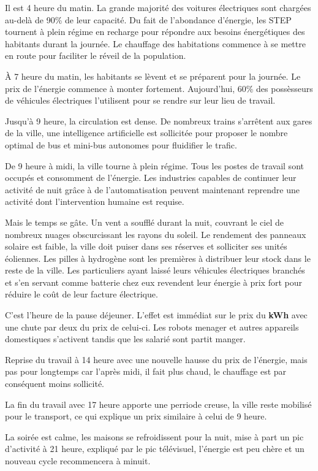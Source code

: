 Il est 4 heure du matin. La grande majorité des voitures électriques sont chargées au-delà de 90\% de leur capacité.
Du fait de l'abondance d'énergie, les STEP tournent à plein régime en recharge pour répondre aux besoins
énergétiques des habitants durant la journée.
Le chauffage des habitations commence à se mettre en route pour faciliter le réveil de la population.

À 7 heure du matin, les habitants se lèvent et se préparent pour la journée. Le prix de l'énergie commence à monter
fortement. Aujourd'hui, 60\% des possèsseurs de véhicules électriques l'utilisent pour se rendre sur leur lieu de travail.

Jusqu'à 9 heure, la circulation est dense. De nombreux trains s'arrêtent aux gares de la ville,
une intelligence artificielle est sollicitée pour proposer le nombre optimal
de bus et mini-bus autonomes pour fluidifier le trafic.

De 9 heure à midi, la ville tourne à plein régime. Tous les postes de travail sont occupés et consomment de l'énergie.
Les industries capables de continuer leur activité de nuit grâce à de l'automatisation peuvent maintenant
reprendre une activité dont l'intervention humaine est requise.

Mais le temps se gâte. Un vent a soufflé durant la nuit, couvrant le ciel de nombreux nuages obscurcissant
les rayons du soleil. Le rendement des panneaux solaire est faible, la ville doit puiser dans
ses réserves et solliciter ses unités éoliennes.
Les pilles à hydrogène sont les premières à distribuer leur stock dans le reste de la ville.
Les particuliers ayant laissé leurs véhicules électriques branchés et s'en servant comme batterie chez eux revendent 
leur énergie à prix fort pour réduire le coût de leur facture électrique.

C'est l'heure de la pause déjeuner. L'effet est immédiat sur le prix du \textbf{kWh} avec une chute par deux du prix
de celui-ci. Les robots menager et autres appareils domestiques s'activent tandis que les salarié sont partit manger.

Reprise du travail à 14 heure avec une nouvelle hausse du prix de l'énergie, mais pas pour longtemps car l'après midi,
il fait plus chaud, le chauffage est par conséquent moins sollicité.

La fin du travail avec 17 heure apporte une perriode creuse, la ville reste mobilisé pour le transport, ce qui explique 
un prix similaire à celui de 9 heure.

La soirée est calme, les maisons se refroidissent pour la nuit, mise à part un pic d'activité à 21 heure, expliqué par le
pic télévisuel, l'énergie est peu chère et un nouveau cycle recommencera à minuit.

